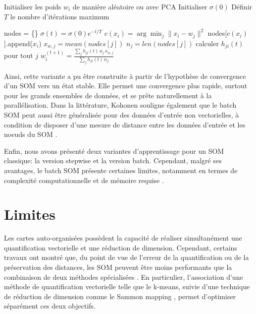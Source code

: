 \documentclass[12pt,a4paper]{report}
\begin{document}
\begin{algorithm}[H]
\caption{Algorithme d'apprentissage d'un batch SOM}
\label{alg:SOM_batch}
\begin{algorithmic}[1]
    \State Initialiser les poids $w_i$ de manière aléatoire ou avec PCA
    \State Initialiser $\sigma(0)$
    \State Définir $T$ le nombre d'itérations maximum
    
        \State nodes = \{\} 
        \State $\sigma(t) = \sigma(0) e^{-t/T}$ 
            \State $c(x_i) = \arg\min_{j} \|x_i - w_j\|^2$
            \State nodes[$c(x_i)$].append($x_i$) 
        \EndFor
            \State $x_{w,j} = mean(nodes[j])$ 
            \State $n_j = len(nodes[j])$ 
        \EndFor
            \State calculer $h_{ji}(t)$ pour tout $j$
            \State $w_i^{(t+1)} = \frac{\sum_{j} h_{ji}(t)\, n_j\, x_{w,j}}{\sum_{j} h_{ji}(t)\, n_j}$ 
        \EndFor
    \EndFor
\end{algorithmic}
\end{algorithm}

Ainsi, cette variante a pu être construite à partir de l'hypothèse de convergence d'un SOM vers un état stable. Elle permet une convergence plus rapide, surtout pour les grands ensembles de données, 
et se prête naturellement à la parallélisation. Dans la littérature, Kohonen souligne également que le batch SOM peut aussi être généralisée
pour des données d'entrée non vectorielles, à condition de disposer d'une mesure de distance entre les données d'entrée et les noeuds du SOM \cite{Kohonen2012SOM}.

Enfin, nous avons présenté deux variantes d'apprentissage pour un SOM classique: la version stepwise et la version batch. 
Cependant, malgré ses avantages, le batch SOM présente certaines limites, notamment en termes de complexité computationnelle et de mémoire requise \cite{SurveySOM}.

\section{Limites}
Les cartes auto-organisées possèdent la capacité de réaliser simultanément une quantification vectorielle et une réduction de dimension. 
Cependant, certains travaux ont montré que, du point de vue de l'erreur de la quantification ou de la préservation des distances, les SOM peuvent être moins performants que 
la combinaison de deux méthodes spécialisées \cite{Limitations_SOM}. En particulier, l'association d'une méthode de quantification vectorielle telle que le k-means, 
suivie d'une technique de réduction de dimension comme le Sammon mapping \cite{Sammon1969}, permet d'optimiser séparément ces deux objectifs.
\end{document}
